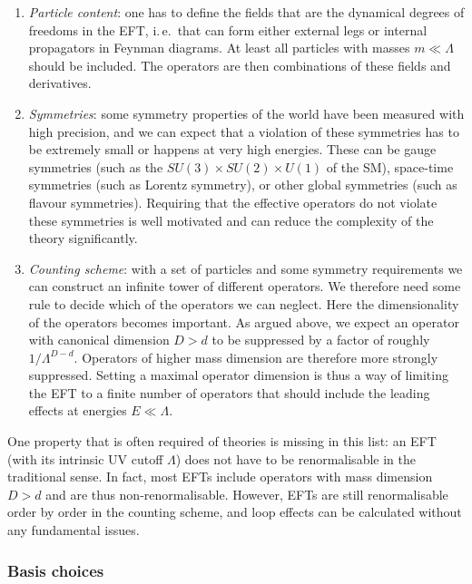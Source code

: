 \begin{enumerate}
\item \emph{Particle content}: one has to define the fields that are
  the dynamical degrees of freedoms in the EFT, i.\,e.\ that can form
  either external legs or internal propagators in Feynman diagrams. At
  least all particles with masses $m \ll \Lambda$ should be
  included. The operators are then combinations of these fields and
  derivatives.
%
\item \emph{Symmetries}: some symmetry properties of the world have
  been measured with high precision, and we can expect that a
  violation of these symmetries has to be extremely small or happens
  at very high energies. These can be gauge symmetries (such as the
  $SU(3) \times SU(2) \times U(1)$ of the SM), space-time symmetries
  (such as Lorentz symmetry), or other global symmetries (such as
  flavour symmetries). Requiring that the effective operators do not
  violate these symmetries is well motivated and can reduce the
  complexity of the theory significantly.
%
\item \emph{Counting scheme}: with a set of particles and some
  symmetry requirements we can construct an infinite tower of
  different operators. We therefore need some rule to decide which of
  the operators we can neglect. Here the dimensionality of the
  operators becomes important. As argued above, we expect an operator
  with canonical dimension $D > d$ to be suppressed by a factor of roughly
  $1 / \Lambda^{D-d}$. Operators of higher mass dimension are
  therefore more strongly suppressed. Setting a maximal operator
  dimension is thus a way of limiting the EFT to a finite number of
  operators that should include the leading effects at energies
  $E \ll \Lambda$.
\end{enumerate}

One property that is often required of theories is missing in this
list: an EFT (with its intrinsic UV cutoff $\Lambda$) does not have to
be renormalisable in the traditional sense. In fact, most EFTs include
operators with mass dimension $D > d$ and are thus non-renormalisable.
However, EFTs are still renormalisable order by order in the counting
scheme, and loop effects can be calculated without any fundamental
issues. 



\subsubsection{Basis choices}

